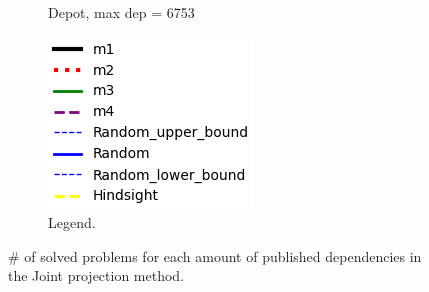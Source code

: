 \documentclass{article}
\newcommand{\commentout}[1]{}
\theoremstyle{remark}
\begin{document}
\begin{figure}[t!]
\begin{subfigure}[b]{0.25\textwidth}
  \caption{Depot, max dep = 6753}
  \label{fig:Depot}
\end{subfigure}\hspace{1em}
\begin{subfigure}[b]{0.1\textwidth}
\centering
  \includegraphics[scale=0.5]{Results_graphs/coverage_legend_with_random}
  \caption{Legend.}
  \label{fig:Legend}
\end{subfigure}\hspace{1em}
\caption{\# of solved problems for each amount of published dependencies in the Joint projection method.
\commentout{Graphs truncated after all methods solve all problems.}}
\label{fig:Coverage}
\end{figure}
\end{document}
